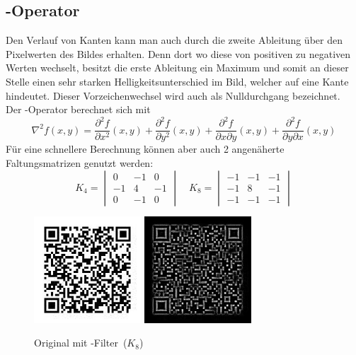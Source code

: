 \subsection*{-Operator}
Den Verlauf von Kanten kann man auch durch die zweite Ableitung über den Pixelwerten des Bildes erhalten.
Denn dort wo diese von positiven zu negativen Werten wechselt, besitzt die erste Ableitung ein Maximum und somit an dieser Stelle einen sehr starken Helligkeitsunterschied im Bild, welcher auf eine Kante hindeutet.
Dieser Vorzeichenwechsel wird auch als Nulldurchgang bezeichnet.~\cite{Toennies2005}
Der -Operator berechnet sich mit
\begin{equation}
  \nabla^2 f(x,y) = \frac{\partial^2 f}{\partial x^2}(x,y) + \frac{\partial^2 f}{\partial y^2}(x,y) + \frac{\partial^2 f}{\partial x \partial y}(x,y) + \frac{\partial^2 f}{\partial y \partial x}(x,y)
\end{equation}
Für eine schnellere Berechnung können aber auch 2 angenäherte Faltungsmatrizen genutzt werden:
\begin{equation}
  K_4 = \begin{vmatrix}
     0 & -1 &  0 \\
    -1 &  4 & -1 \\
     0 & -1 &  0
  \end{vmatrix}
  \quad
  K_8 = \begin{vmatrix}
    -1 & -1 & -1 \\
    -1 &  8 & -1 \\
    -1 & -1 & -1
  \end{vmatrix}
\end{equation}
\begin{figure}[H]
  \centering
  \includegraphics[height=4cm]{img/QR/perfect_03.jpg}
  \includegraphics[height=4cm]{img/QR/qr-laplace.jpg}
  \caption[Beispiel -Filter]{Original mit -Filter~($K_8$)}
  \label{fig:laplace}
\end{figure}



